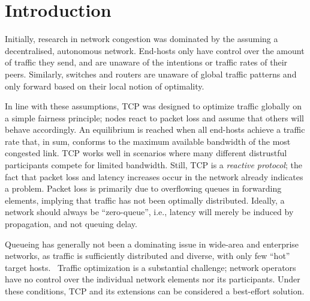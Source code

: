 \section{Introduction}
\label{sec:intro}

Initially, research in network congestion  was dominated by the  assuming a decentralised, autonomous network. End-hosts only have control over the amount of traffic they send, and are unaware of the intentions or traffic rates of their peers. Similarly, switches and routers are unaware of global traffic patterns and only forward based on their local notion of optimality.

In line with these assumptions, TCP was designed to optimize traffic globally on a simple fairness principle; nodes react to packet loss and assume that others will behave accordingly. An equilibrium is reached when all end-hosts achieve a traffic rate that, in sum, conforms to the maximum available bandwidth of the most congested link.
TCP works well  in scenarios where many different distrustful participants compete for limited bandwidth. Still, TCP is a \textit{reactive protocol}; the fact that packet loss and latency increases occur in the network already indicates a problem. Packet loss is primarily  due to overflowing  queues in forwarding elements, implying that traffic has not been optimally distributed. 
Ideally, a network should always be “zero-queue”, i.e., latency will merely be induced by propagation, and not queuing delay. 

Queueing has generally not been a dominating issue in wide-area and enterprise networks, as traffic is sufficiently distributed and diverse, with only few “hot” target hosts.~\cite{hedera, microte} Traffic optimization is a substantial challenge; network operators have no control over the individual network elements nor its participants. Under these conditions, TCP and its extensions can be considered a best-effort solution.

